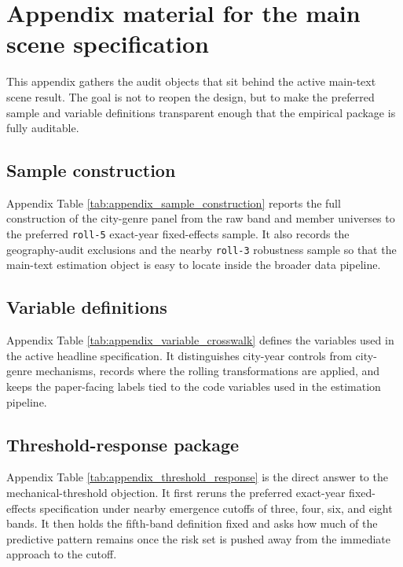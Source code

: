 \section{Appendix material for the main scene specification}

This appendix gathers the audit objects that sit behind the active main-text scene result. The
goal is not to reopen the design, but to make the preferred sample and variable definitions
transparent enough that the empirical package is fully auditable.

\subsection{Sample construction}

Appendix Table \ref{tab:appendix_sample_construction} reports the full construction of the
city-genre panel from the raw band and member universes to the preferred \texttt{roll-5}
exact-year fixed-effects sample. It also records the geography-audit exclusions and the nearby
\texttt{roll-3} robustness sample so that the main-text estimation object is easy to locate inside
the broader data pipeline.



\subsection{Variable definitions}

Appendix Table \ref{tab:appendix_variable_crosswalk} defines the variables used in the active
headline specification. It distinguishes city-year controls from city-genre mechanisms, records
where the rolling transformations are applied, and keeps the paper-facing labels tied to the code
variables used in the estimation pipeline.



\subsection{Threshold-response package}

Appendix Table \ref{tab:appendix_threshold_response} is the direct answer to the mechanical-threshold
objection. It first reruns the preferred exact-year fixed-effects specification under nearby
emergence cutoffs of three, four, six, and eight bands. It then holds the fifth-band definition
fixed and asks how much of the predictive pattern remains once the risk set is pushed away from the
immediate approach to the cutoff.

